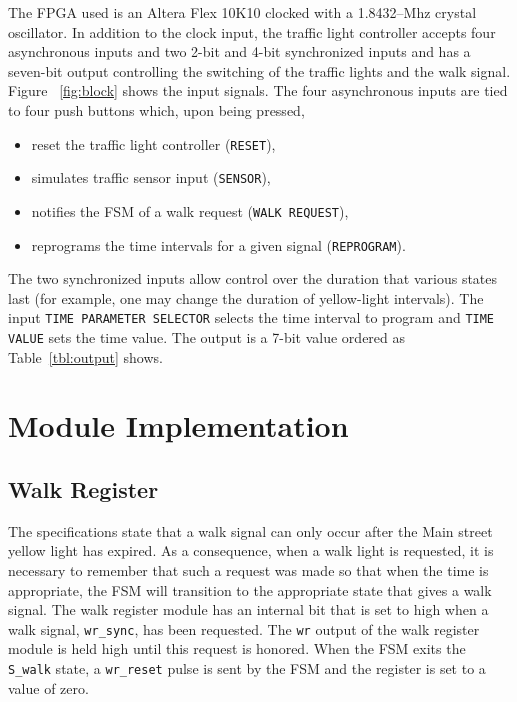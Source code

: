 \documentclass[12pt]{article}
\begin{document}
	The FPGA used is an Altera Flex 10K10
	clocked with a 1.8432--Mhz crystal oscillator.
	In addition to the clock input, the traffic light controller accepts four
	asynchronous inputs and two 2-bit and 4-bit synchronized inputs and has a
	seven-bit output controlling the switching of the traffic lights and the
	walk signal.  Figure ~\ref{fig:block} shows the input signals.  The four
	asynchronous inputs are tied to four push buttons which, upon being
	pressed,
	\begin{itemize}
		\item reset the traffic light controller (\texttt{RESET}),
		\item simulates traffic sensor input (\texttt{SENSOR}),
		\item notifies the FSM of a walk request (\texttt{WALK REQUEST}),
		\item reprograms the time intervals for a given signal (\texttt{REPROGRAM}).
	\end{itemize}

	The two synchronized inputs allow control over the duration that
	various states last (for example, one may change the duration of
	yellow-light intervals).  The input \texttt{TIME PARAMETER SELECTOR}
	selects the time interval to program and \texttt{TIME VALUE} sets
	the time value.  The output is a 7-bit value ordered as
	Table~\ref{tbl:output} shows.
	

\section{Module Implementation}
	\subsection{Walk Register}
	The specifications state that a walk signal can only occur after the
	Main street yellow light has expired.  As a consequence, when a walk
	light is requested, it is necessary to remember that such a request
	was made so that when the time is appropriate, the FSM will transition
	to the appropriate state that gives a walk signal.
	The walk register module has an internal bit that is set to high when a
	walk signal, \texttt{wr\_sync}, has been requested.  The \texttt{wr}
	output of the walk register module is held high until this request is
	honored.  When the FSM exits the \texttt{S\_walk} state, a
	\texttt{wr\_reset} pulse is sent by the FSM and the register is set to
	a value of zero.
\end{document}
